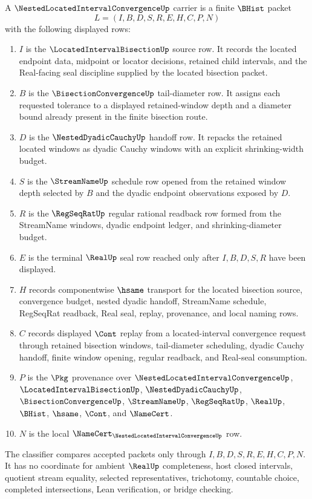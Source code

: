 \begin{definition}
\label{def:nested-located-interval-convergence-carrier}
A $\NestedLocatedIntervalConvergenceUp$ carrier is a finite $\BHist$ packet
$$
L=(I,B,D,S,R,E,H,C,P,N)
$$
with the following displayed rows:
\begin{enumerate}
\item $I$ is the $\LocatedIntervalBisectionUp$ source row. It records the located endpoint data, midpoint or locator decisions, retained child intervals, and the Real-facing seal discipline supplied by the located bisection packet.
\item $B$ is the $\BisectionConvergenceUp$ tail-diameter row. It assigns each requested tolerance to a displayed retained-window depth and a diameter bound already present in the finite bisection route.
\item $D$ is the $\NestedDyadicCauchyUp$ handoff row. It repacks the retained located windows as dyadic Cauchy windows with an explicit shrinking-width budget.
\item $S$ is the $\StreamNameUp$ schedule row opened from the retained window depth selected by $B$ and the dyadic endpoint observations exposed by $D$.
\item $R$ is the $\RegSeqRatUp$ regular rational readback row formed from the StreamName windows, dyadic endpoint ledger, and shrinking-diameter budget.
\item $E$ is the terminal $\RealUp$ seal row reached only after $I,B,D,S,R$ have been displayed.
\item $H$ records componentwise $\hsame$ transport for the located bisection source, convergence budget, nested dyadic handoff, StreamName schedule, RegSeqRat readback, Real seal, replay, provenance, and local naming rows.
\item $C$ records displayed $\Cont$ replay from a located-interval convergence request through retained bisection windows, tail-diameter scheduling, dyadic Cauchy handoff, finite window opening, regular readback, and Real-seal consumption.
\item $P$ is the $\Pkg$ provenance over $\NestedLocatedIntervalConvergenceUp$, $\LocatedIntervalBisectionUp$, $\NestedDyadicCauchyUp$, $\BisectionConvergenceUp$, $\StreamNameUp$, $\RegSeqRatUp$, $\RealUp$, $\BHist$, $\hsame$, $\Cont$, and $\NameCert$.
\item $N$ is the local $\NameCert_{\NestedLocatedIntervalConvergenceUp}$ row.
\end{enumerate}
The classifier compares accepted packets only through $I,B,D,S,R,E,H,C,P,N$. It has no coordinate for ambient $\RealUp$ completeness, host closed intervals, quotient stream equality, selected representatives, trichotomy, countable choice, completed intersections, Lean verification, or bridge checking.
\end{definition}

